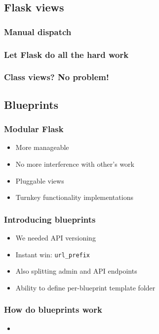\documentclass{beamer}
\begin{document}
\subsection{Flask views}

\begin{frame}
  \frametitle{Manual dispatch}
  
\end{frame}

\begin{frame}
  \frametitle{Let Flask do all the hard work}
  
\end{frame}

\begin{frame}
  \frametitle{Class views? No problem!}
  
\end{frame}

\subsection{Blueprints}

\begin{frame}
  \frametitle{Modular Flask}
  \begin{itemize}
  \item More manageable
  \item No more interference with other's work
  \item Pluggable views
  \item Turnkey functionality implementations
  \end{itemize}
\end{frame}

\begin{frame}
  \frametitle{Introducing blueprints}
  \begin{itemize}
  \item We needed API versioning
  \item Instant win: \texttt{url\_prefix}
  \item Also splitting admin and API endpoints
  \item Ability to define per-blueprint template folder
  \end{itemize}
\end{frame}

\begin{frame}
  \frametitle{How do blueprints work}
  \begin{itemize}
  \item
  \end{itemize}

\end{frame}
\end{document}
